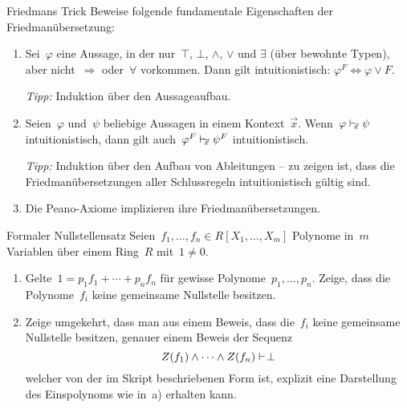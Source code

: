 \documentclass{pizzablatt}
\begin{document}
\begin{aufgabe}{Friedmans Trick}
Beweise folgende fundamentale Eigenschaften der Friedmanübersetzung:
\begin{enumerate}
\item Sei~$\varphi$ eine Aussage, in der nur~$\top$, $\bot$,
$\wedge$, $\vee$ und $\exists$ (über
bewohnte Typen), aber nicht~$\Rightarrow$ oder~$\forall$ vorkommen.
Dann gilt intuitionistisch: $\varphi^F \Longleftrightarrow \varphi \vee F$.

\emph{Tipp:} Induktion über den Aussageaufbau.

\item Seien~$\varphi$ und~$\psi$ beliebige Aussagen in einem Kontext~$\vec x$.
Wenn~$\varphi \mathrel{\vdash\!\!\!_{\vec x}} \psi$ intuitionistisch, dann gilt auch~$\varphi^F
\mathrel{\vdash\!\!\!_{\vec x}} \psi^F$ intuitionistisch.

\emph{Tipp:} Induktion über den Aufbau von Ableitungen -- zu zeigen ist, dass
die Friedmanübersetzungen aller Schlussregeln intuitionistisch gültig sind.

\item Die Peano-Axiome implizieren ihre Friedmanübersetzungen.
\end{enumerate}
\end{aufgabe}

\begin{aufgabe}{Formaler Nullstellensatz}
Seien~$f_1,\ldots,f_n \in R[X_1,\ldots,X_m]$ Polynome in~$m$ Variablen über
einem Ring~$R$ mit~$1 \neq 0$.
\begin{enumerate}
\item
Gelte~$1 = p_1 f_1 + \cdots + p_n f_n$ für gewisse Polynome~$p_1,\ldots,p_n$.
Zeige, dass die Polynome~$f_i$ keine gemeinsame Nullstelle besitzen.
\item Zeige umgekehrt, dass man aus einem Beweis, dass die~$f_i$ keine
gemeinsame Nullstelle besitzen, genauer einem Beweis der Sequenz
\[ Z(f_1) \wedge \cdots \wedge Z(f_n) \mathrel{\vdash\!\!\!_{}} \bot \]
welcher von der im Skript beschriebenen Form ist, explizit eine Darstellung des
Eins\-polynoms wie in~a) erhalten kann.
\end{enumerate}
\end{aufgabe}
\end{document}
